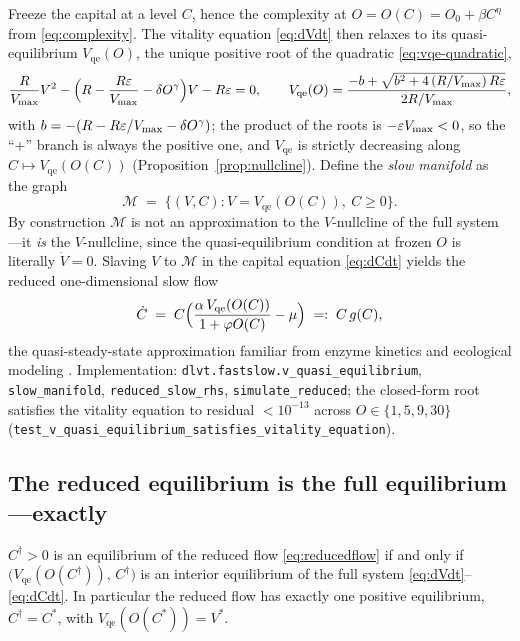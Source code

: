 Freeze the capital at a level $C$, hence the complexity at
$O=O(C)=O_0+\beta C^{\eta}$ from \eqref{eq:complexity}. The vitality
equation \eqref{eq:dVdt} then relaxes to its quasi-equilibrium
$V_{\mathrm{qe}}(O)$, the unique positive root of the quadratic
\eqref{eq:vqe-quadratic},
\[
\frac{R}{V_{\max}}V^{2}
-\Bigl(R-\frac{R\varepsilon}{V_{\max}}-\delta O^{\gamma}\Bigr)V
-R\varepsilon=0 ,
\qquad
V_{\mathrm{qe}}(O)=\frac{-b+\sqrt{b^{2}+4\,(R/V_{\max})\,R\varepsilon}}{2R/V_{\max}},
\]
with $b=-(R-R\varepsilon/V_{\max}-\delta O^{\gamma})$; the product of the
roots is $-\varepsilon V_{\max}<0$, so the ``$+$'' branch is always the
positive one, and $V_{\mathrm{qe}}$ is strictly decreasing along
$C\mapsto V_{\mathrm{qe}}(O(C))$ (Proposition~\ref{prop:nullcline}). Define the
\emph{slow manifold} as the graph
\begin{equation}
\label{eq:slowmanifold}
\mathcal{M}
\;=\;
\bigl\{(V,C): V=V_{\mathrm{qe}}(O(C)),\ C\ge0\bigr\}.
\end{equation}
By construction $\mathcal{M}$ is not an approximation to the
$V$-nullcline of the full system---it \emph{is} the $V$-nullcline, since
the quasi-equilibrium condition at frozen $O$ is literally $\dot V=0$.
Slaving $V$ to $\mathcal{M}$ in the capital equation
\eqref{eq:dCdt} yields the reduced one-dimensional slow flow
\begin{equation}
\label{eq:reducedflow}
\dot C
\;=\;
C\Bigl(\frac{\alpha\,V_{\mathrm{qe}}(O(C))}{1+\varphi O(C)}-\mu\Bigr)
\;=:\;
C\,g(C),
\end{equation}
the quasi-steady-state approximation familiar from enzyme kinetics and
ecological modeling \citep{murray2002mathematical}. Implementation:
\texttt{dlvt.fastslow.v\_quasi\_equilibrium},
\texttt{slow\_manifold}, \texttt{reduced\_slow\_rhs},
\texttt{simulate\_reduced}; the closed-form root satisfies the vitality
equation to residual $<10^{-13}$ across $O\in\{1,5,9,30\}$
(\texttt{test\_v\_quasi\_equilibrium\_satisfies\_vitality\_equation}).

\subsection{The reduced equilibrium is the full equilibrium---exactly}

\begin{proposition}
\label{prop:reducedeq}
$C^{\dagger}>0$ is an equilibrium of the reduced flow
\eqref{eq:reducedflow} if and only if
$\bigl(V_{\mathrm{qe}}(O(C^{\dagger})),\,C^{\dagger}\bigr)$ is an interior
equilibrium of the full system
\eqref{eq:dVdt}--\eqref{eq:dCdt}. In particular the reduced flow has
exactly one positive equilibrium, $C^{\dagger}=C^{*}$, with
$V_{\mathrm{qe}}(O(C^{*}))=V^{*}$.
\end{proposition}

